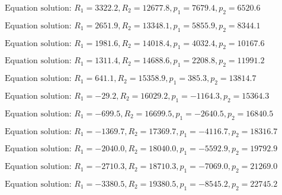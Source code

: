 \documentclass[11pt]{article}
\newcommand{\prompt}[4]{
        {\ttfamily\llap{{\color{#2}[#3]:\hspace{3pt}#4}}\vspace{-\baselineskip}}
    }
\begin{document}
    $\text{Equation solution: } R_1=3322.2,R_2=12677.8, p_1=7679.4, p_2=6520.6$

    
 
            
\prompt{Out}{outcolor}{12}{}
    
    $\text{Equation solution: } R_1=2651.9,R_2=13348.1, p_1=5855.9, p_2=8344.1$

    
 
            
\prompt{Out}{outcolor}{12}{}
    
    $\text{Equation solution: } R_1=1981.6,R_2=14018.4, p_1=4032.4, p_2=10167.6$

    
 
            
\prompt{Out}{outcolor}{12}{}
    
    $\text{Equation solution: } R_1=1311.4,R_2=14688.6, p_1=2208.8, p_2=11991.2$

    
 
            
\prompt{Out}{outcolor}{12}{}
    
    $\text{Equation solution: } R_1=641.1,R_2=15358.9, p_1=385.3, p_2=13814.7$

    
 
            
\prompt{Out}{outcolor}{12}{}
    
    $\text{Equation solution: } R_1=-29.2,R_2=16029.2, p_1=-1164.3, p_2=15364.3$

    
 
            
\prompt{Out}{outcolor}{12}{}
    
    $\text{Equation solution: } R_1=-699.5,R_2=16699.5, p_1=-2640.5, p_2=16840.5$

    
 
            
\prompt{Out}{outcolor}{12}{}
    
    $\text{Equation solution: } R_1=-1369.7,R_2=17369.7, p_1=-4116.7, p_2=18316.7$

    
 
            
\prompt{Out}{outcolor}{12}{}
    
    $\text{Equation solution: } R_1=-2040.0,R_2=18040.0, p_1=-5592.9, p_2=19792.9$

    
 
            
\prompt{Out}{outcolor}{12}{}
    
    $\text{Equation solution: } R_1=-2710.3,R_2=18710.3, p_1=-7069.0, p_2=21269.0$

    
 
            
\prompt{Out}{outcolor}{12}{}
    
    $\text{Equation solution: } R_1=-3380.5,R_2=19380.5, p_1=-8545.2, p_2=22745.2$
\end{document}
